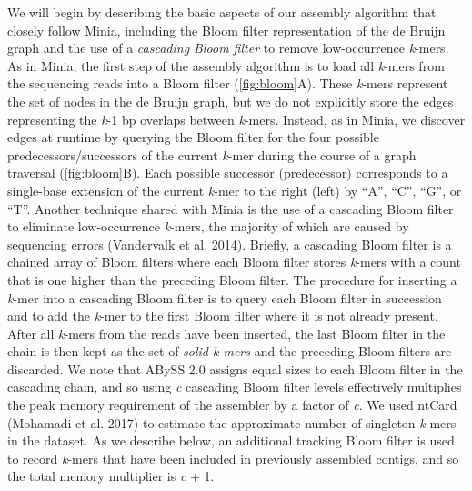 \documentclass[
  12pt,
  oneside,
  openany]{book}
\begin{document}
We will begin by describing the basic aspects of our assembly algorithm that closely follow Minia, including the Bloom filter representation of the de Bruijn graph and the use of a \emph{cascading Bloom filter} to remove low-occurrence \emph{k}-mers. As in Minia, the first step of the assembly algorithm is to load all \emph{k}-mers from the sequencing reads into a Bloom filter (\cref{fig:bloom}A). These \emph{k}-mers represent the set of nodes in the de Bruijn graph, but we do not explicitly store the edges representing the \emph{k}-1 bp overlaps between \emph{k}-mers. Instead, as in Minia, we discover edges at runtime by querying the Bloom filter for the four possible predecessors/successors of the current \emph{k}-mer during the course of a graph traversal (\cref{fig:bloom}B). Each possible successor (predecessor) corresponds to a single-base extension of the current \emph{k}-mer to the right (left) by ``A'', ``C'', ``G'', or ``T''. Another technique shared with Minia is the use of a cascading Bloom filter to eliminate low-occurrence \emph{k}-mers, the majority of which are caused by sequencing errors (Vandervalk et al. 2014). Briefly, a cascading Bloom filter is a chained array of Bloom filters where each Bloom filter stores \emph{k}-mers with a count that is one higher than the preceding Bloom filter. The procedure for inserting a \emph{k}-mer into a cascading Bloom filter is to query each Bloom filter in succession and to add the \emph{k}-mer to the first Bloom filter where it is not already present. After all \emph{k}-mers from the reads have been inserted, the last Bloom filter in the chain is then kept as the set of \emph{solid k-mers} and the preceding Bloom filters are discarded. We note that ABySS 2.0 assigns equal sizes to each Bloom filter in the cascading chain, and so using \emph{c} cascading Bloom filter levels effectively multiplies the peak memory requirement of the assembler by a factor of \emph{c}. We used ntCard (Mohamadi et al. 2017) to estimate the approximate number of singleton \emph{k}-mers in the dataset. As we describe below, an additional tracking Bloom filter is used to record \emph{k}-mers that have been included in previously assembled contigs, and so the total memory multiplier is \emph{c} + 1.
\end{document}
